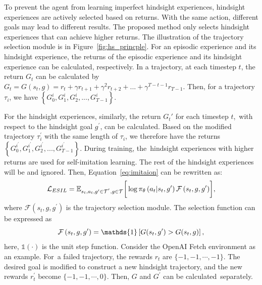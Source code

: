 To prevent the agent from learning imperfect hindsight experiences, {hindsight experiences are actively selected based on returns.} With the same action, different goals may lead to different results. The proposed method only selects hindsight experiences that can achieve higher returns. The illustration of the trajectory selection module is in Figure~\ref{fig:hs_princple}. For an episodic experience and its hindsight experience, the returns of the episodic experience and its hindsight experience can be calculated, respectively. 
In a trajectory, at each timestep $t$, the return $G_{t}$ can be calculated by $G_{t} = G(s_t, g) = r_{t} + \gamma r_{t+1} + \gamma^{2} r_{t+2} + ... + \gamma^{T-t-1} r_{T-1}$. Then, for a trajectory $\tau_{i}$, we have $\left\{G_{0}^{i}, G_{1}^{i}, G_{2}^{i}, ..., G_{T-1}^{i}\right\}$.

For the hindsight experiences, similarly, the return $G_{t}'$ for each timestep $t$,~with respect to the hindsight goal $g^\prime$, can be calculated. Based on the modified trajectory $\tau_{i}^{\prime}$ with the same length of $\tau_{i}$, we therefore have the returns $\left\{G_{0}^{i^\prime}, G_{1}^{i^\prime}, G_{2}^{i^\prime}, ..., G_{T-1}^{i^\prime}\right\}$. During training, the~hindsight experiences with higher returns are used for self-imitation learning. The rest of the hindsight experiences will be  and ignored.
Then, Equation~\eqref{eq:imitaion} can be rewritten as:
\begin{equation}
  \centering
  \mathcal{L}_{ESIL}=\mathbb{E}_{s_{t}, a_{t}, g^\prime\in\Tau^{'},g\in\Tau}\biggr[\log\pi_{\theta}\left(a_{t}|s_{t}, g^\prime\right)\mathcal{F}\left(s_{t}, g, g^\prime\right)\biggr],
  \label{eq:final_loss}
\end{equation}
where $\mathcal{F}\left(s_{t}, g, g^{\prime}\right)$ is the trajectory selection module. The selection function can be expressed as
\begin{equation}
  \centering
  \mathcal{F}\left(s_{t}, g, g^\prime \right)=\mathds{1}\left[G(s_{t}, g^\prime) > G(s_{t}, g)\right],
\end{equation}
here, {$\mathds{1}(\cdot)$ is the unit step function}. Consider the OpenAI Fetch environment as an example. For~a failed trajectory, the rewards $r_{t}$ are $\{-1,-1,\cdots, -1\}$. {The desired goal is modified} to construct a new hindsight trajectory, and the new rewards $r_{t}^{\prime}$ become $\{-1,-1,\cdots, 0\}$. Then,  {$G$ and $G^{\prime}$ can be calculated~separately.}
